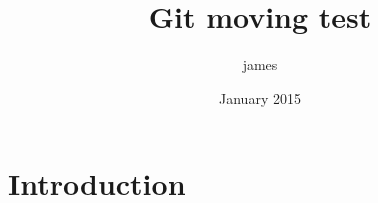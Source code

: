 \documentclass{article}
\title{Git moving test}
\author{james }
\date{January 2015}
\begin{document}
\maketitle

\section{Introduction}
\end{document}

